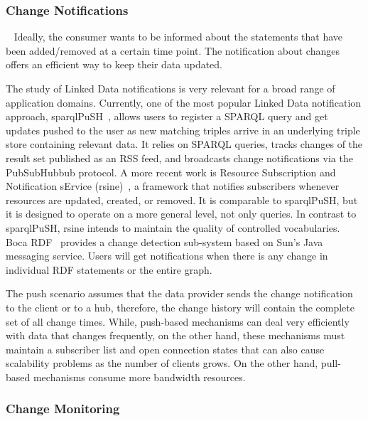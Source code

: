 \documentclass[sw]{iosart2x}
\begin{document}

\subsubsection{Change Notifications}\label{Notifications}
~\cite{UmbrichVH10}
Ideally, the consumer wants to be informed about the statements that have been added/removed at a certain time point. The notification about changes offers an efficient way to keep their data updated.

The study of Linked Data notifications is very relevant for a broad range of application domains. Currently, one of the most popular Linked Data notification approach, sparqlPuSH~\cite{PassantM10}, allows users to register a SPARQL query and get updates pushed to the user as new matching triples arrive in an underlying triple store containing relevant data. It relies on SPARQL queries, tracks changes of the result set published as an RSS feed, and broadcasts change notifications via the PubSubHubbub protocol. A more recent work is Resource Subscription and Notification sErvice (rsine)~\cite{MaderMS14}, a framework that notifies subscribers whenever resources are updated, created, or removed. It is comparable to sparqlPuSH, but it is designed to operate on a more general level, not only queries. In contrast to sparqlPuSH, rsine intends to maintain the quality of controlled vocabularies. Boca RDF~\cite{MissierACDG07} provides a change detection sub-system based on Sun’s Java messaging service. Users will get notifications when there is any change in individual RDF statements or the entire graph.

The push scenario assumes that the data provider sends the change notification to the client or to a hub, therefore, the change history will contain the complete set of all change times. While, push-based mechanisms can deal very efficiently with data that changes frequently, on the other hand, these mechanisms must maintain a subscriber list and open connection states that can also cause scalability problems as the number of clients grows. On the other hand, pull-based mechanisms consume more bandwidth resources.\\

\subsubsection{Change Monitoring}\label{Monitoring}
~\cite{UmbrichHHPD10}

\end{document}
